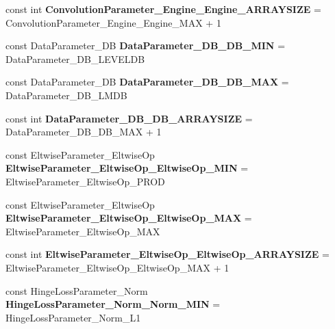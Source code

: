 \begin{DoxyCompactItemize}
\mbox{\label{namespacecaffe_ab9e9d5c3a3aea56aefb1a24b82d22a82}} 
const int {\bfseries Convolution\+Parameter\+\_\+\+Engine\+\_\+\+Engine\+\_\+\+A\+R\+R\+A\+Y\+S\+I\+ZE} = Convolution\+Parameter\+\_\+\+Engine\+\_\+\+Engine\+\_\+\+M\+AX + 1
\item 
\mbox{\label{namespacecaffe_a1c7ba7421fa5b46c4ab1630c2028add7}} 
const Data\+Parameter\+\_\+\+DB {\bfseries Data\+Parameter\+\_\+\+D\+B\+\_\+\+D\+B\+\_\+\+M\+IN} = Data\+Parameter\+\_\+\+D\+B\+\_\+\+L\+E\+V\+E\+L\+DB
\item 
\mbox{\label{namespacecaffe_a5419f274bf2dbe8672506822852dc6b6}} 
const Data\+Parameter\+\_\+\+DB {\bfseries Data\+Parameter\+\_\+\+D\+B\+\_\+\+D\+B\+\_\+\+M\+AX} = Data\+Parameter\+\_\+\+D\+B\+\_\+\+L\+M\+DB
\item 
\mbox{\label{namespacecaffe_a5381deaaba93e7f754f12cc13c237dfb}} 
const int {\bfseries Data\+Parameter\+\_\+\+D\+B\+\_\+\+D\+B\+\_\+\+A\+R\+R\+A\+Y\+S\+I\+ZE} = Data\+Parameter\+\_\+\+D\+B\+\_\+\+D\+B\+\_\+\+M\+AX + 1
\item 
\mbox{\label{namespacecaffe_ad72d95487734dc8732ebee2a7c4aef55}} 
const Eltwise\+Parameter\+\_\+\+Eltwise\+Op {\bfseries Eltwise\+Parameter\+\_\+\+Eltwise\+Op\+\_\+\+Eltwise\+Op\+\_\+\+M\+IN} = Eltwise\+Parameter\+\_\+\+Eltwise\+Op\+\_\+\+P\+R\+OD
\item 
\mbox{\label{namespacecaffe_aa8e18508148830cc6fe9249301adbad1}} 
const Eltwise\+Parameter\+\_\+\+Eltwise\+Op {\bfseries Eltwise\+Parameter\+\_\+\+Eltwise\+Op\+\_\+\+Eltwise\+Op\+\_\+\+M\+AX} = Eltwise\+Parameter\+\_\+\+Eltwise\+Op\+\_\+\+M\+AX
\item 
\mbox{\label{namespacecaffe_a4cda3e762be0845bccbc3c9a4f6dcf3a}} 
const int {\bfseries Eltwise\+Parameter\+\_\+\+Eltwise\+Op\+\_\+\+Eltwise\+Op\+\_\+\+A\+R\+R\+A\+Y\+S\+I\+ZE} = Eltwise\+Parameter\+\_\+\+Eltwise\+Op\+\_\+\+Eltwise\+Op\+\_\+\+M\+AX + 1
\item 
\mbox{\label{namespacecaffe_a7d13fe2ecfdf828374f966d727260af3}} 
const Hinge\+Loss\+Parameter\+\_\+\+Norm {\bfseries Hinge\+Loss\+Parameter\+\_\+\+Norm\+\_\+\+Norm\+\_\+\+M\+IN} = Hinge\+Loss\+Parameter\+\_\+\+Norm\+\_\+\+L1

\end{DoxyCompactItemize}
